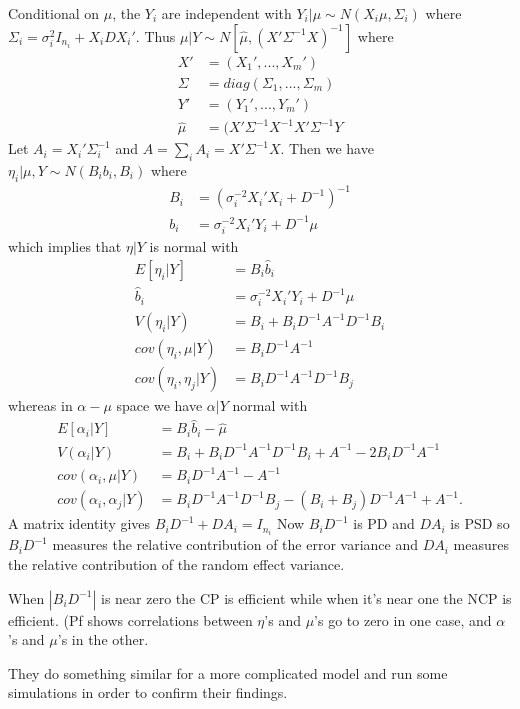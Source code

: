 \documentclass{article}\usepackage[]{graphicx}\usepackage[]{color}
\begin{document}
Conditional on $\mu$, the $Y_i$ are independent with $Y_i|\mu \sim N(X_i\mu, \Sigma_i)$ where $\Sigma_i = \sigma_i^2I_{n_i} + X_iDX_i'$. Thus $\mu|Y\sim N[\hat{\mu},(X'\Sigma^{-1}X)^{-1}]$ where
\begin{align*}
  X' & = (X_1',...,X_m')\\
  \Sigma & = diag(\Sigma_1,...,\Sigma_m)\\
  Y' & = (Y_1',...,Y_m')\\
  \hat{\mu} & = (X'\Sigma^{-1}X^{-1}X'\Sigma^{-1}Y
\end{align*}
Let $A_i=X_i'\Sigma_i^{-1}$ and $A=\sum_iA_i=X'\Sigma^{-1}X$. Then we have $\eta_i|\mu,Y\sim N(B_ib_i,B_i)$ where 
\begin{align*}
  B_i &= (\sigma_i^{-2}X_i'X_i + D^{-1})^{-1}\\
  b_i &= \sigma_i^{-2}X_i'Y_i +D^{-1}\mu
\end{align*}
which implies that $\eta|Y$ is normal with
\begin{align*}
  E[\eta_i|Y] &= B_i\hat{b}_i\\
  \hat{b}_i & = \sigma_i^{-2}X_i'Y_i + D^{-1}\hat{\mu}\\
  V(\eta_i|Y) & = B_i + B_iD^{-1}A^{-1}D^{-1}B_i\\
  cov(\eta_i,\mu|Y)&=B_iD^{-1}A^{-1}\\
  cov(\eta_i,\eta_j|Y)&=B_iD^{-1}A^{-1}D^{-1}B_j
\end{align*}
whereas in $\alpha-\mu$ space we have $\alpha|Y$ normal with
\begin{align*}
  E[\alpha_i|Y] &= B_i\hat{b}_i - \hat{\mu}\\
  V(\alpha_i|Y) &= B_i + B_iD^{-1}A^{-1}D^{-1}B_i + A^{-1} -2B_iD^{-1}A^{-1}\\
  cov(\alpha_i,\mu|Y) &= B_iD^{-1}A^{-1} - A^{-1}\\
  cov(\alpha_i,\alpha_j|Y) &= B_iD^{-1}A^{-1}D^{-1}B_j - (B_i + B_j)D^{-1}A^{-1} + A^{-1}.
\end{align*}
A matrix identity gives $B_iD^{-1} + DA_i = I_{n_i}$ Now $B_iD^{-1}$ is PD and $DA_i$ is PSD so $B_iD^{-1}$ measures the relative contribution of the error variance and $DA_i$ measures the relative contribution of the random effect variance.

When $|B_iD^{-1}|$ is near zero the CP is efficient while when it's near one the NCP is efficient. (Pf shows correlations between $\eta$'s and $\mu$'s go to zero in one case, and $\alpha$'s and $\mu$'s in the other.

They do something similar for a more complicated model and run some simulations in order to confirm their findings.
\end{document}
